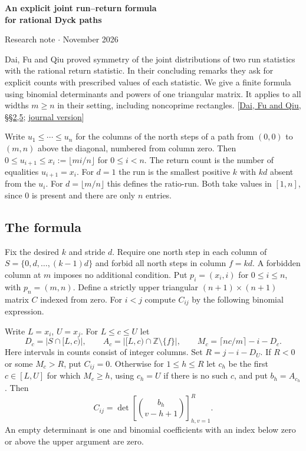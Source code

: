 \documentclass[11pt]{article}
\begin{document}
\begin{center}{\Large\bfseries An explicit joint run--return formula\\ for rational Dyck paths}\par
\small Research note \enspace$\cdot$ November 2026\end{center}

Dai, Fu and Qiu proved symmetry of the joint distributions of two run statistics with the rational return statistic. In their concluding remarks they ask for explicit counts with prescribed values of each statistic. We give a finite formula using binomial determinants and powers of one triangular matrix. It applies to all widths $m\ge n$ in their setting, including noncoprime rectangles. [\href{https://arxiv.org/abs/2503.20155}{Dai, Fu and Qiu, \S\S2,5}; \href{https://doi.org/10.1016/j.aam.2026.103066}{journal version}]

Write $u_1\le\cdots\le u_n$ for the columns of the north steps of a path from $(0,0)$ to $(m,n)$ above the diagonal, numbered from column zero. Then $0\le u_{i+1}\le x_i:=\lfloor mi/n\rfloor$ for $0\le i<n$. The return count is the number of equalities $u_{i+1}=x_i$. For $d=1$ the run is the smallest positive $k$ with $kd$ absent from the $u_i$. For $d=\lfloor m/n\rfloor$ this defines the ratio-run. Both take values in $[1,n]$, since $0$ is present and there are only $n$ entries.

\subsection*{The formula}
Fix the desired $k$ and stride $d$. Require one north step in each column of $S=\{0,d,\ldots,(k-1)d\}$ and forbid all north steps in column $f=kd$. A forbidden column at $m$ imposes no additional condition. Put $p_i=(x_i,i)$ for $0\le i\le n$, with $p_n=(m,n)$. Define a strictly upper triangular $(n+1)\times(n+1)$ matrix $C$ indexed from zero. For $i<j$ compute $C_{ij}$ by the following binomial expression.

Write $L=x_i$, $U=x_j$. For $L\le c\le U$ let
\[
 D_c=|S\cap[L,c)|,\qquad A_c=|[L,c)\cap\mathbb Z\setminus\{f\}|,\qquad
 M_c=\lceil nc/m\rceil-i-D_c .
\]
Here intervals in counts consist of integer columns. Set $R=j-i-D_U$. If $R<0$ or some $M_c>R$, put $C_{ij}=0$. Otherwise for $1\le h\le R$ let $c_h$ be the first $c\in[L,U]$ for which $M_c\ge h$, using $c_h=U$ if there is no such $c$, and put $b_h=A_{c_h}$. Then
\[
 C_{ij}=\det\left[\binom{b_h}{v-h+1}\right]_{h,v=1}^{R}.
 \tag{1}
\]
An empty determinant is one and binomial coefficients with an index below zero or above the upper argument are zero.
\end{document}
